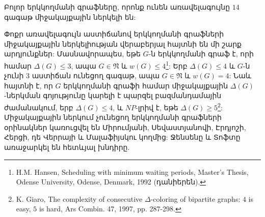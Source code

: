 \begin{hide}
\begin{theorem}\cite{Giaro1999}
\label{t3_Giaro_14} Բոլոր երկկողմանի գրաֆները, որոնք ունեն առավելագույնը $14$ գագաթ միջակայքային ներկելի են:
\end{theorem}
\end{hide}

Փոքր առավելագույն աստիճանով երկկողմանի գրաֆների միջակայքային ներկելիության վերաբերյալ հայտնի են մի շարք արդյունքներ: Մասնավորապես, եթե $G$-ն երկկողմանի գրաֆ է, որի համար 
$\Delta(G)\leq 3$, ապա $G\in \mathfrak{N}$ և $w(G)\leq 4$\footnote{H.M. Hansen, Scheduling with minimum waiting periods, Master's Thesis, Odense University, Odense, Denmark, 1992 (դանիերեն).}: Երբ $\Delta(G) \leq 4$ և $G$-ն չունի $3$ աստիճան ունեցող գագաթ, ապա $G\in \mathfrak{N}$ և $w(G)=4$: Նաև հայտնի է, որ $G$ երկկողմանի գրաֆի համար միջակայքային $\Delta(G)$-ներկման գոյությունը կարելի է պարզել բազմանդամային ժամանակում, երբ $\Delta(G)\leq 4$, և $NP$-լրիվ է, եթե $\Delta(G)\geq 5$\footnote{K. Giaro, The complexity of consecutive $\Delta $-coloring of bipartite graphs: $4$ is easy, $5$ is hard, Ars Combin. 47, 1997, pp. 287-298.}: Միջակայքային ներկում չունեցող երկկողմանի գրաֆների օրինակներ կառուցվել են Միրումյանի, Սեվաստյանովի, Էրդյոշի, Հերցի, դե Վերրայի և Մալաֆիյսկու կողմից: Ջենսենը և Տոֆտը առաջարկել են հետևյալ խնդիրը.

